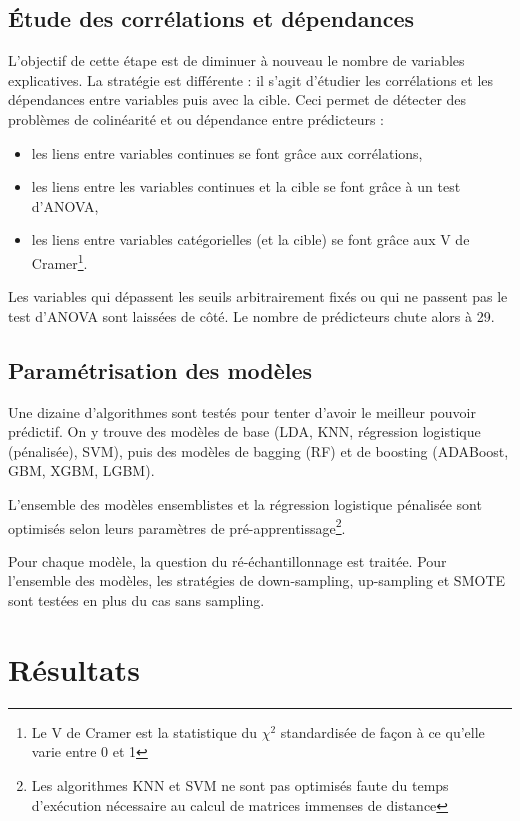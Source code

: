 \documentclass[french]{article}
\begin{document}
\begin{multicols}{2}
\subsection{Étude des corrélations et dépendances}

L'objectif de cette étape est de diminuer à nouveau le nombre de variables explicatives. La stratégie est différente : il s'agit d'étudier les corrélations et les dépendances entre variables puis avec la cible. Ceci permet de détecter des problèmes de colinéarité et ou dépendance entre prédicteurs :

\begin{itemize}
    \item les liens entre variables continues se font grâce aux corrélations,
    \item les liens entre les variables continues et la cible se font grâce à un test d'ANOVA,
    \item les liens entre variables catégorielles (et la cible) se font grâce aux V de Cramer\footnote{Le V de Cramer est la statistique du $\chi^2$ standardisée de façon à ce qu'elle varie entre 0 et 1}.
\end{itemize}

Les variables qui dépassent les seuils arbitrairement fixés ou qui ne passent pas le test d'ANOVA sont laissées de côté. Le nombre de prédicteurs chute alors à 29. %

\subsection{Paramétrisation des modèles}

Une dizaine d'algorithmes sont testés pour tenter d'avoir le meilleur pouvoir prédictif. On y trouve des modèles de base (LDA, KNN, régression logistique (pénalisée), SVM), puis des modèles de bagging (RF) et de boosting (ADABoost, GBM, XGBM, LGBM).

L'ensemble des modèles ensemblistes et la régression logistique pénalisée sont optimisés selon leurs paramètres de pré-apprentissage\footnote{Les algorithmes KNN et SVM ne sont pas optimisés faute du temps d'exécution nécessaire au calcul de matrices immenses de distance}.

Pour chaque modèle, la question du ré-échantillonnage est traitée. Pour l'ensemble des modèles, les stratégies de down-sampling, up-sampling et SMOTE sont testées en plus du cas sans sampling.

\section{Résultats}


\end{multicols}
\end{document}
